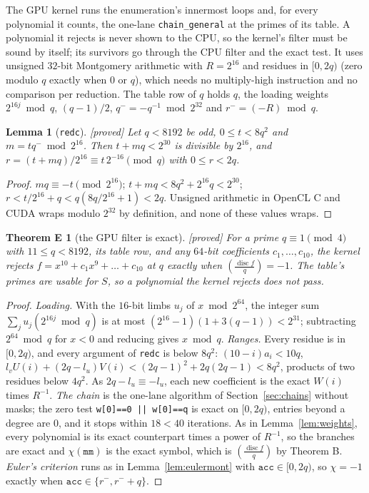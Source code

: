 \documentclass[10pt,a4paper]{article}
\DeclareMathOperator{\disc}{disc}
\newcommand{\leg}[2]{\left(\frac{#1}{#2}\right)}
\newcommand{\code}[1]{\texttt{#1}}
\newcommand{\stproved}{\textsf{\small[proved]}\xspace}
\theoremstyle{plain}
\newtheorem{lemma}[proposition]{Lemma}
\newtheorem*{thmE}{Theorem E}
\theoremstyle{definition}
\begin{document}
The GPU kernel runs the enumeration's innermost loops and, for every polynomial it counts, the one-lane \code{chain\_general} at the primes of its table.  A
polynomial it rejects is never shown to the CPU, so the kernel's filter must be sound by itself; its survivors go through the CPU filter and the exact test.
It uses unsigned $32$-bit Montgomery arithmetic with $R=2^{16}$ and residues in $[0,2q)$ (zero modulo $q$ exactly when $0$ or $q$), which needs no
multiply-high instruction and no comparison per reduction.  The table row of $q$ holds $q$, the loading weights $2^{16j}\bmod q$, $(q-1)/2$, $q^-=-q^{-1}\bmod2^{32}$
and $r^-=(-R)\bmod q$.

\begin{lemma}[\code{redc}]\label{lem:redc}\stproved
Let $q<8192$ be odd, $0\le t<8q^2$ and $m=tq^-\bmod2^{16}$.  Then $t+mq<2^{30}$ is divisible by $2^{16}$, and $r=(t+mq)/2^{16}\equiv t\,2^{-16}\pmod q$ with
$0\le r<2q$.
\end{lemma}
\begin{proof}
$mq\equiv-t\pmod{2^{16}}$; $t+mq<8q^2+2^{16}q<2^{30}$; $r<t/2^{16}+q<q(8q/2^{16}+1)<2q$.  Unsigned arithmetic in OpenCL C and CUDA wraps modulo $2^{32}$ by
definition, and none of these values wraps.
\end{proof}

\begin{thmE}[the GPU filter is exact]\stproved
For a prime $q\equiv1\pmod4$ with $11\le q<8192$, its table row, and any $64$-bit coefficients $c_1,\dots,c_{10}$, the kernel rejects $f=x^{10}+c_1x^9+\dots+c_{10}$
at $q$ exactly when $\leg{\disc f}{q}=-1$.  The table's primes are usable for $S$, so a polynomial the kernel rejects does not pass.
\end{thmE}
\begin{proof}
\emph{Loading.}  With the $16$-bit limbs $u_j$ of $x\bmod2^{64}$, the integer sum $\sum_ju_j(2^{16j}\bmod q)$ is at most $(2^{16}-1)(1+3(q-1))<2^{31}$; subtracting
$2^{64}\bmod q$ for $x<0$ and reducing gives $x\bmod q$.  \emph{Ranges.}  Every residue is in $[0,2q)$, and every argument of \code{redc} is below $8q^2$:
$(10-i)a_i<10q$, $l_vU(i)+(2q-l_u)V(i)<(2q-1)^2+2q(2q-1)<8q^2$, products of two residues below $4q^2$.  As $2q-l_u\equiv-l_u$, each new coefficient is the exact
$W(i)$ times $R^{-1}$.  \emph{The chain} is the one-lane algorithm of Section~\ref{sec:chains} without masks; the zero test \code{w[0]==0 || w[0]==q} is exact on
$[0,2q)$, entries beyond a degree are $0$, and it stops within $18<40$ iterations.  As in Lemma~\ref{lem:weights}, every polynomial is its exact counterpart times a
power of $R^{-1}$, so the branches are exact and $\chi(\code{mm})$ is the exact symbol, which is $\leg{\disc f}{q}$ by Theorem B.  \emph{Euler's criterion} runs as in
Lemma~\ref{lem:eulermont} with $\code{acc}\in[0,2q)$, so $\chi=-1$ exactly when $\code{acc}\in\{r^-,r^-+q\}$.
\end{proof}
\end{document}
